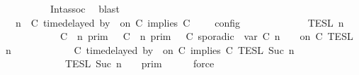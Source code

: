 \begin{isabellebody}
\ \ \ \ \ \ \ \ \ \ Int{\isacharunderscore}assoc\ \isamarkupfalse%
\ blast\isanewline
\ \ \isamarkupfalse%
\ \isamarkupfalse%
\ {\isacartoucheopen}{\isasymlbrakk}\ {\isasymGamma}{\isacharcomma}\ n\ {\isasymTurnstile}\ {\isacharparenleft}C\ time{\isacharminus}delayed{\isasymbowtie}\ by\ {\isasymdelta}{\isasymtau}\ on\ C\ implies\ C\ {\isacharhash}\ {\isasymPsi}\ {\isasymtriangleright}\ {\isasymPhi}\ {\isasymrbrakk}\isactrlsub c\isactrlsub o\isactrlsub n\isactrlsub f\isactrlsub i\isactrlsub g\isanewline
\ \ \ \ \ \ \ \ \ \ {\isacharequal}\ {\isasymlbrakk}{\isasymlbrakk}\ {\isasymPsi}\ {\isasymrbrakk}{\isasymrbrakk}\isactrlsub T\isactrlsub E\isactrlsub S\isactrlsub L\isactrlbsup {\isasymge}\ n\isactrlesup \isanewline
\ \ \ \ \ \ \ \ \ \ {\isasyminter}\ {\isacharparenleft}{\isasymlbrakk}\ C\ {\isasymnot}{\isasymUp}\ n\ {\isasymrbrakk}\isactrlsub p\isactrlsub r\isactrlsub i\isactrlsub m\ {\isasymunion}\ {\isasymlbrakk}\ C\ {\isasymUp}\ n\ {\isasymrbrakk}\isactrlsub p\isactrlsub r\isactrlsub i\isactrlsub m\ {\isasyminter}\ {\isasymlbrakk}\ C\ sporadic{\isasymsharp}\ {\isasymlparr}\ {\isasymtau}\isactrlsub v\isactrlsub a\isactrlsub r\ {\isacharparenleft}C\ n{\isacharparenright}\ {\isasymoplus}\ {\isasymdelta}{\isasymtau}\ {\isasymrparr}\ on\ C\ {\isasymrbrakk}\isactrlsub T\isactrlsub E\isactrlsub S\isactrlsub L\isactrlbsup {\isasymge}\ n\isactrlesup {\isacharparenright}\isanewline
\ \ \ \ \ \ \ \ \ \ {\isasyminter}\ {\isasymlbrakk}\ C\ time{\isacharminus}delayed{\isasymbowtie}\ by\ {\isasymdelta}{\isasymtau}\ on\ C\ implies\ C\ {\isasymrbrakk}\isactrlsub T\isactrlsub E\isactrlsub S\isactrlsub L\isactrlbsup {\isasymge}\ Suc\ n\isactrlesup \isanewline
\ \ \ \ \ \ \ \ \ \ {\isasyminter}\ {\isacharparenleft}{\isasymlbrakk}{\isasymlbrakk}\ {\isasymPhi}\ {\isasymrbrakk}{\isasymrbrakk}\isactrlsub T\isactrlsub E\isactrlsub S\isactrlsub L\isactrlbsup {\isasymge}\ Suc\ n\isactrlesup \ {\isasyminter}\ {\isasymlbrakk}{\isasymlbrakk}\ {\isasymGamma}\ {\isasymrbrakk}{\isasymrbrakk}\isactrlsub p\isactrlsub r\isactrlsub i\isactrlsub m{\isacharparenright}{\isacartoucheclose}\isanewline
\ \ \ \ \isamarkupfalse%
\ force\isanewline
\ \ \isamarkupfalse%
\ \isamarkupfalse%

\end{isabellebody}
